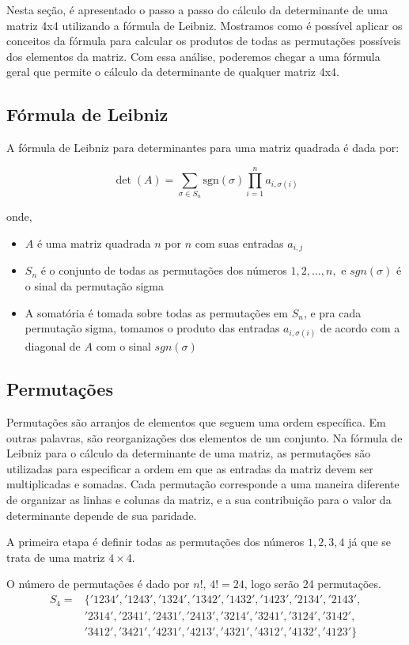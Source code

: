 \documentclass[12pt, a4paper]{article}
\begin{document}
Nesta seção, é apresentado o passo a passo do cálculo da determinante de uma matriz 4x4 utilizando a fórmula de Leibniz. Mostramos como é possível aplicar os conceitos da fórmula para calcular os produtos de todas as permutações possíveis dos elementos da matriz. Com essa análise, poderemos chegar a uma fórmula geral que permite o cálculo da determinante de qualquer matriz 4x4.
\subsection{Fórmula de Leibniz}
A fórmula de Leibniz para determinantes para uma matriz quadrada é dada por:

$$
\det(A) = \sum_{\sigma \in S_n} \mathrm{sgn}(\sigma) \prod_{i=1}^n a_{i,\sigma(i)}
$$

\noindent onde,
\begin{itemize}
\item $A$ é uma matriz quadrada $n$ por $n$ com suas entradas $a_{i,j}$
\item $S_n$ é o conjunto de todas as permutações dos números $1, 2, ..., n,$ e $sgn(\sigma)$ é o sinal da permutação sigma
\item A somatória é tomada sobre todas as permutações em $S_n$,  e pra cada permutação sigma, tomamos o produto das entradas $a_{i,\sigma(i)}$ de acordo com a diagonal de $A$ com o sinal  $sgn(\sigma)$ 
\end{itemize}

\subsection{Permutações}
Permutações são arranjos de elementos que seguem uma ordem específica. Em outras palavras, são reorganizações dos elementos de um conjunto. Na fórmula de Leibniz para o cálculo da determinante de uma matriz, as permutações são utilizadas para especificar a ordem em que as entradas da matriz devem ser multiplicadas e somadas. Cada permutação corresponde a uma maneira diferente de organizar as linhas e colunas da matriz, e a sua contribuição para o valor da determinante depende de sua paridade.
\\
\par A primeira etapa é definir todas as permutações dos números $1, 2, 3, 4$ já que se trata de uma matriz $4 \times 4$.
\par O número de permutações é dado por $n!$, $4! = 24$, logo serão 24 permutações.
\begin{equation*}
\begin{aligned}
S_4 = & \{'1234', '1243', '1324', '1342', '1432', '1423', '2134', '2143', \\
    & '2314', '2341', '2431', '2413', '3214', '3241', '3124', '3142', \\
    & '3412', '3421', '4231', '4213', '4321', '4312', '4132', '4123'\}
\end{aligned}
\end{equation*}
\end{document}
